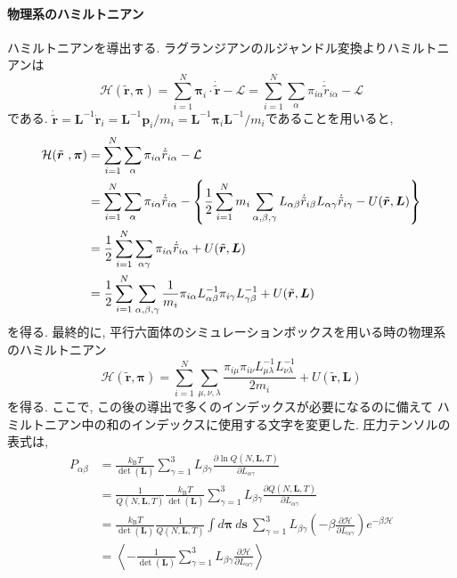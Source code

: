 \paragraph{物理系のハミルトニアン}
ハミルトニアンを導出する. ラグランジアンのルジャンドル変換よりハミルトニアンは
\begin{equation}
  \mathcal{H}(\tilde{\bm{r}}, \bm{\pi})
  =
  \sum_{i=1}^{N} \bm{\pi}_{i} \cdot \dot{\tilde{\bm{r}}} - \mathcal{L}
  =
  \sum_{i=1}^{N} \sum_{\alpha} \pi_{i\alpha} \dot{\tilde{r}}_{i\alpha} - \mathcal{L}
\end{equation}
である. 
$\dot{\tilde{\bm{r}}} = \bm{L}^{-1} \dot{\bm{r}}_{i} = \bm{L}^{-1}\bm{p}_{i}/m_{i} = \bm{L}^{-1}\bm{\pi}_{i} \bm{L}^{-1}/m_{i}$であることを用いると, 
\begin{align}
  \mathcal{H}(\tilde{\bm{r}}~, \bm{\pi})
 &=
  \sum_{i=1}^{N} \sum_{\alpha} \pi_{i\alpha} \dot{\tilde{r}}_{i\alpha} - \mathcal{L}
  \\
  \notag
 &=
  \sum_{i=1}^{N} \sum_{\alpha} \pi_{i\alpha} \dot{\tilde{r}}_{i\alpha}
   - \left\{
          \frac{1}{2}
          \sum_{i=1}^{N} m_{i}
          \sum_{\alpha,\beta,\gamma}
           L_{\alpha\beta}  \dot{\tilde{r}}_{i\beta}
           L_{\alpha\gamma} \dot{\tilde{r}}_{i\gamma}
         - U(\tilde{\bm{r}}, \bm{L})
   \right\}
  \\
  \notag
 &=
  \frac{1}{2}
  \sum_{i=1}^{N} \sum_{\alpha\gamma} \pi_{i\alpha} \dot{\tilde{r}}_{i\alpha}
  +U(\tilde{\bm{r}}, \bm{L})
  \\
  \notag
 &=
 \frac{1}{2}
 \sum_{i=1}^{N} \sum_{\alpha,\beta,\gamma}
 \frac{1}{m_{i}}
 \pi_{i\alpha} L_{\alpha\beta}^{-1} \pi_{i\gamma} L_{\gamma\beta}^{-1}
 +U(\tilde{\bm{r}}, \bm{L})
\end{align}
を得る.
最終的に, 平行六面体のシミュレーションボックスを用いる時の物理系のハミルトニアン
\begin{equation}
  \mathcal{H}(\tilde{\bm{r}}, \bm{\pi})
  =
  \sum_{i=1}^{N} \sum_{\mu, \nu, \lambda}
  \frac{\pi_{i\mu} \pi_{i\nu} L_{\mu\lambda}^{-1} L_{\nu\lambda}^{-1}}{2m_{i}}
  +
  U(\tilde{\bm{r}}, \bm{L})
\end{equation}
を得る. 
ここで, この後の導出で多くのインデックスが必要になるのに備えて ハミルトニアン中の和のインデックスに使用する文字を変更した. 
圧力テンソルの表式は, 
\begin{align}
  P_{\alpha\beta} &=
  \frac{k_{\mathrm{B}}T}{\det(\bm{L})}
  \sum_{\gamma=1}^{3} L_{\beta\gamma}\frac{\partial \ln Q(N,\bm{L},T)}{\partial L_{\alpha\gamma}}
  \\ &=
  \frac{1}{Q(N,\bm{L},T)}\frac{k_{\mathrm{B}}T}{\det(\bm{L})}
  \sum_{\gamma=1}^{3} L_{\beta\gamma}\frac{\partial Q(N,\bm{L},T)}{\partial L_{\alpha\gamma}}
  \\ &=
  \frac{k_{\mathrm{B}}T}{\det(\bm{L})}\frac{1}{Q(N,\bm{L},T)}
  \int d\bm{\pi}~d\bm{s}~\sum_{\gamma=1}^{3} L_{\beta\gamma}
  \left(-\beta \frac{\partial \mathcal{H}}{\partial L_{\alpha\gamma}}\right) e^{-\beta \mathcal{H}}
  \\&=
  \left\langle
  - \frac{1}{\det(\bm{L})} \sum_{\gamma=1}^{3} L_{\beta\gamma} \frac{\partial \mathcal{H}}{\partial L_{\alpha\gamma}}
  \right\rangle
  \label{Eq:Pressure-Tensor-NVT}
\end{align}
